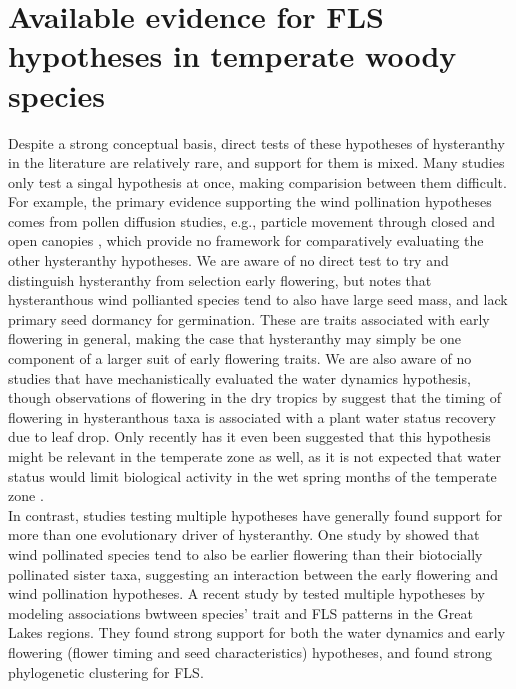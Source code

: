 \documentclass[12pt]{article}\usepackage[]{graphicx}\usepackage[]{color}
\begin{document}

\section*{Available evidence for FLS hypotheses in temperate woody species} %
\indent\indent Despite a strong conceptual basis, direct tests of these hypotheses of hysteranthy in the literature are relatively rare, and support for them is mixed.  Many studies only test a singal hypothesis at once, making comparision between them difficult. For example, the primary evidence supporting the wind pollination hypotheses comes from pollen diffusion studies, e.g., particle movement through closed and open canopies \citep{Niklas1985,Nathan2005, Milleron2012}, which provide no framework for comparatively evaluating the other hysteranthy hypotheses. We are aware of no direct test to try and distinguish hysteranthy from selection early flowering, but \citet{Primack1987} notes that hysteranthous wind pollianted species tend to also have large seed mass, and lack primary seed dormancy for germination. These are traits associated with early flowering in general, making the case that hysteranthy may simply be one component of a larger suit of early flowering traits. We are also aware of no studies that have mechanistically evaluated the water dynamics hypothesis, though observations of flowering in the dry tropics by \citet{Borchert1983,Reich1984} suggest that the timing of flowering in hysteranthous taxa is associated with a plant water status recovery due to leaf drop. Only recently has it even been suggested that this hypothesis might be relevant in the temperate zone as well, as it is not expected that water status would limit biological activity in the wet spring months of the temperate zone \citep{Gougherty_2018}.\\
\indent In contrast, studies testing multiple hypotheses  have generally found support for more than one evolutionary driver of hysteranthy. One study by \citet{Bolmgren2003} showed that wind pollinated species tend to also be earlier flowering than their biotocially pollinated sister taxa, suggesting an interaction between the early flowering and wind pollination hypotheses. A recent study by \citet{Gougherty_2018} tested multiple hypotheses by modeling associations bwtween species' trait and FLS patterns in the Great Lakes regions. They found strong support for both the water dynamics and early flowering (flower timing and seed characteristics) hypotheses, and found strong phylogenetic clustering for FLS. \\
\end{document}
